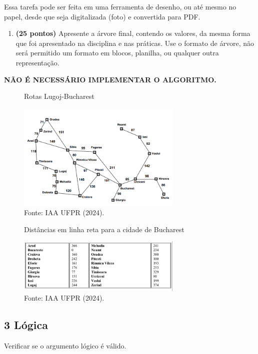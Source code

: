     Essa tarefa pode ser feita em uma ferramenta de desenho, ou até mesmo no papel, desde que seja digitalizada (foto) e convertida para PDF.
    \begin{enumerate}[label=\alph*)]
        \item \textbf{(25 pontos)} Apresente a árvore final, contendo os valores, da mesma forma que foi apresentado na disciplina e nas práticas. Use o formato de árvore, não será permitido um formato em blocos, planilha, ou qualquer outra representação.
    \end{enumerate}

    \textbf{NÃO É NECESSÁRIO IMPLEMENTAR O ALGORITMO.}
    \begin{figure}[H]
        \centering
        \caption{Rotas Lugoj-Bucharest}
        \includegraphics[width=0.7\textwidth]{apendices/fig/1_IAA001_1.png} 
        \caption*{Fonte: IAA UFPR (2024).}
    \end{figure}
    \begin{figure}[H]
        \centering
        \caption{Distâncias em linha reta para a cidade de Bucharest}
        \includegraphics[width=0.7\textwidth]{apendices/fig/1_IAA001_2.png} 
        \caption*{Fonte: IAA UFPR (2024).}
    \end{figure}

\subsection*{\textbf{3 Lógica}}
    Verificar se o argumento lógico é válido.


